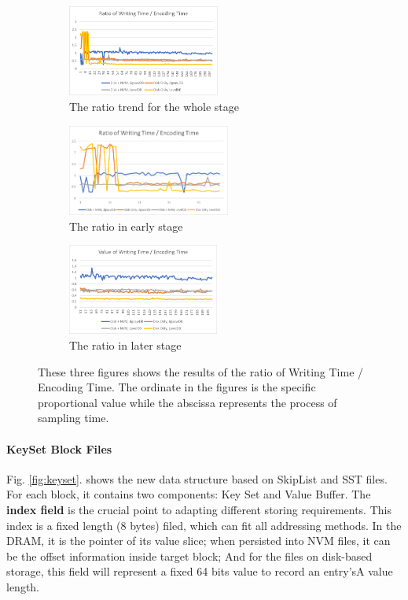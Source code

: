 \begin{figure}
	\label{fig:we_values}
	\begin{subfigure}[t]{0.3\linewidth}
		\centering
		\includegraphics[height= 3cm]{fig/ratio_full}
		\caption{The ratio trend for the whole stage}
		\label{fig:ratiofull}
	\end{subfigure}%
	\hspace{0.5cm}
	\begin{subfigure}[t]{0.3\linewidth}
		\centering
		\includegraphics[height= 3cm]{fig/ratio_first_50}
		\caption{The ratio in early stage}
		\label{fig:ratiofirst50}
	\end{subfigure}%
	\hspace{0.5cm}
	\begin{subfigure}[t]{0.3\linewidth}
		\centering
		\includegraphics[height= 3cm]{fig/ratio_last_170}
		\caption{The ratio in later stage}
		\label{fig:ratiolast170}
	\end{subfigure}
	\caption{These three figures shows the results of the ratio of Writing Time / Encoding Time. The ordinate in the figures is the specific proportional value while the abscissa represents the process of sampling time.}
\end{figure}


\paragraph{KeySet Block Files}\label{sec:format_introduction}

Fig. \ref{fig:keyset}. shows the new data structure based on SkipList and SST files. For each block, it contains two components: Key Set and Value Buffer. 
The \textbf{index field} is the crucial point to adapting different storing requirements. This index is a fixed length (8 bytes) filed, which can fit all addressing methods. In the DRAM, it is the pointer of its value slice; when persisted into NVM files, it can be the offset information inside target block; And for the files on disk-based storage, this field will represent a fixed 64 bits value to record an entry'sA value length.

